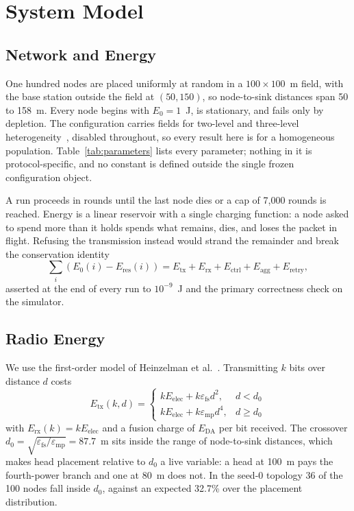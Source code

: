 \section{System Model}
\label{sec:model}



\subsection{Network and Energy}

One hundred nodes are placed uniformly at random in a $100\times100$~m field,
with the base station outside the field at $(50, 150)$, so node-to-sink
distances span 50 to 158~m. Every node begins with $E_0 = 1$~J, is stationary,
and fails only by depletion. The configuration carries fields for two-level and
three-level heterogeneity~\cite{smaragdakis2004sep,qing2006deec}, disabled
throughout, so every result here is for a homogeneous population.
Table~\ref{tab:parameters} lists every parameter; nothing in it is
protocol-specific, and no constant is defined outside the single frozen
configuration object.

A run proceeds in rounds until the last node dies or a cap of 7{,}000 rounds is
reached. Energy is a linear reservoir with a single charging function: a node
asked to spend more than it holds spends what remains, dies, and loses the
packet in flight. Refusing the transmission instead would strand the remainder
and break the conservation identity
\begin{equation}
\sum_i \left( E_0(i) - E_{\mathrm{res}}(i) \right)
= E_{\mathrm{tx}} + E_{\mathrm{rx}} + E_{\mathrm{ctrl}}
+ E_{\mathrm{agg}} + E_{\mathrm{retry}},
\label{eq:conservation}
\end{equation}
asserted at the end of every run to $10^{-9}$~J and the primary correctness
check on the simulator.

\subsection{Radio Energy}

We use the first-order model of Heinzelman et
al.~\cite{heinzelman2000leach,heinzelman2002appspecific}. Transmitting $k$ bits
over distance $d$ costs
\begin{equation}
E_{\mathrm{tx}}(k, d) =
\begin{cases}
k E_{\mathrm{elec}} + k \varepsilon_{\mathrm{fs}} d^{2}, & d < d_0 \\[2pt]
k E_{\mathrm{elec}} + k \varepsilon_{\mathrm{mp}} d^{4}, & d \geq d_0
\end{cases}
\label{eq:radio}
\end{equation}
with $E_{\mathrm{rx}}(k) = k E_{\mathrm{elec}}$ and a fusion charge of
$E_{\mathrm{DA}}$ per bit received. The crossover
$d_0 = \sqrt{\varepsilon_{\mathrm{fs}}/\varepsilon_{\mathrm{mp}}} = 87.7$~m sits
inside the range of node-to-sink distances, which makes head placement relative
to $d_0$ a live variable: a head at 100~m pays the fourth-power branch and one
at 80~m does not. In the seed-0 topology 36 of the 100 nodes fall inside $d_0$,
against an expected 32.7\% over the placement distribution.

